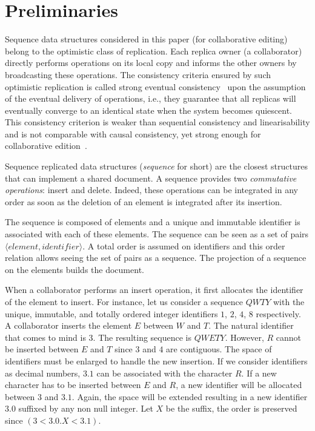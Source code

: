 
\section{Preliminaries}
\label{sec:preliminaries}


Sequence data structures considered in this paper (for collaborative
editing) belong to the optimistic class of replication. Each replica owner (a
collaborator) directly performs operations on its local copy and informs the
other owners by broadcasting these operations. The consistency criteria ensured
by such optimistic replication is called strong eventual
consistency~\cite{shapiro2011comprehensive} upon the assumption of the eventual
delivery of operations, i.e., they guarantee that all replicas will eventually
converge to an identical state when the system becomes quiescent. This
consistency criterion is weaker than sequential consistency and linearisability
and is not comparable with causal consistency, yet strong enough for
collaborative edition~\cite{shapiro2011comprehensive}.

Sequence replicated data structures (\emph{sequence} for short) are the closest
structures that can implement a shared document. A sequence provides two
\emph{commutative operations}: insert and delete. Indeed, these operations can
be integrated in any order as soon as the deletion of an element is integrated
after its insertion.

The sequence is composed of elements and a unique and immutable identifier is
associated with each of these elements. The sequence can be seen as a set of
pairs $\langle element, identifier \rangle$. A total order is assumed on
identifiers and this order relation allows seeing the set of pairs as a
sequence. The projection of a sequence on the elements builds the document.

When a collaborator performs an insert operation, it first allocates the
identifier of the element to insert. For instance, let us consider a sequence
$QWTY$ with the unique, immutable, and totally ordered integer identifiers $1$,
$2$, $4$, $8$ respectively. A collaborator inserts the element $E$ between $W$
and $T$. The natural identifier that comes to mind is $3$. The resulting
sequence is $QWETY$. However, $R$ cannot be inserted between $E$ and $T$ since
$3$ and $4$ are contiguous. The space of identifiers must be enlarged to handle
the new insertion. If we consider identifiers as decimal numbers, $3.1$ can be
associated with the character $R$. If a new character has to be inserted
between $E$ and $R$, a new identifier will be allocated between $3$ and
$3.1$. Again, the space will be extended resulting in a new identifier $3.0$
suffixed by any non null integer. Let $X$ be the suffix, the order is preserved
since $(3 < 3.0.X < 3.1)$.

